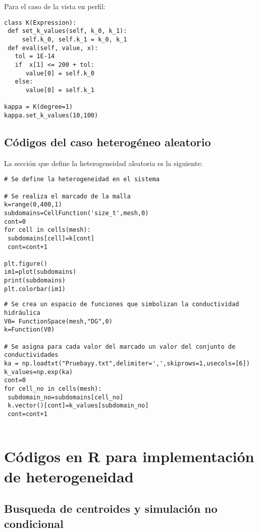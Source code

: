 Para el caso de la vista en perfil:

\lstset{language=python,breaklines=true, basicstyle=\footnotesize}
\begin{lstlisting}[frame=single]
class K(Expression):
 def set_k_values(self, k_0, k_1):
     self.k_0, self.k_1 = k_0, k_1
 def eval(self, value, x):
   tol = 1E-14 
   if  x[1] <= 200 + tol:
      value[0] = self.k_0
   else:
      value[0] = self.k_1

kappa = K(degree=1)
kappa.set_k_values(10,100)

\end{lstlisting}

\section{Códigos del caso heterogéneo aleatorio}

La sección que define la heterogeneidad aleatoria es la siguiente:

\begin{lstlisting}[frame=single]
# Se define la heterogeneidad en el sistema

# Se realiza el marcado de la malla
k=range(0,400,1)
subdomains=CellFunction('size_t',mesh,0)
cont=0
for cell in cells(mesh):
 subdomains[cell]=k[cont]
 cont=cont+1

plt.figure()
im1=plot(subdomains)
print(subdomains)
plt.colorbar(im1)
\end{lstlisting}
\begin{lstlisting}[frame=single]
# Se crea un espacio de funciones que simbolizan la conductividad hidráulica   
V0= FunctionSpace(mesh,"DG",0)
k=Function(V0)

# Se asigna para cada valor del marcado un valor del conjunto de conductividades
ka = np.loadtxt("Pruebayy.txt",delimiter=',',skiprows=1,usecols=[6])
k_values=np.exp(ka)
cont=0
for cell_no in cells(mesh):
 subdomain_no=subdomains[cell_no]
 k.vector()[cont]=k_values[subdomain_no]
 cont=cont+1


\end{lstlisting}

\chapter{Códigos en R para implementación de heterogeneidad}
\section{Busqueda de centroides y simulación no condicional}

